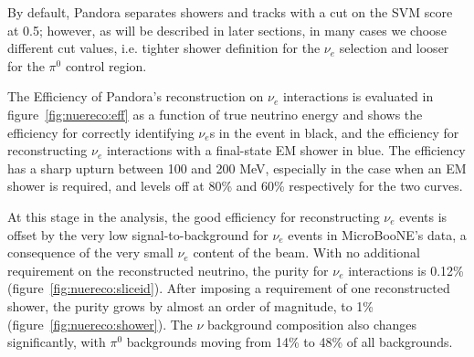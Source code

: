 \documentclass[a4paper]{article}
\begin{document}
By default, Pandora separates showers and tracks with a cut on the SVM score at 0.5; however, as will be described in later sections, in many cases we choose different cut values, i.e. tighter shower definition for the $\nu_e$ selection and looser for the $\pi^0$ control region.

\par The Efficiency of Pandora's reconstruction on $\nu_e$ interactions is evaluated in figure~\ref{fig:nuereco:eff} as a function of true neutrino energy and shows the efficiency for correctly identifying $\nu_e$s in the event in black, and the efficiency for reconstructing $\nu_e$ interactions with a final-state EM shower in blue. The efficiency has a sharp upturn between 100 and 200 MeV, especially in the case when an EM shower is required, and levels off at 80\% and 60\% respectively for the two curves. 
\par At this stage in the analysis, the good efficiency for reconstructing $\nu_e$ events is offset by the very low signal-to-background for $\nu_e$ events in MicroBooNE's data, a consequence of the very small $\nu_e$ content of the beam. With no additional requirement on the reconstructed neutrino, the purity for $\nu_e$ interactions is 0.12\% (figure~\ref{fig:nuereco:sliceid}). After imposing a requirement of one reconstructed shower, the purity grows by almost an order of magnitude, to 1\% (figure~\ref{fig:nuereco:shower}). The $\nu$ background composition also changes significantly, with $\pi^0$ backgrounds moving from 14\% to 48\% of all backgrounds.
\end{document}
